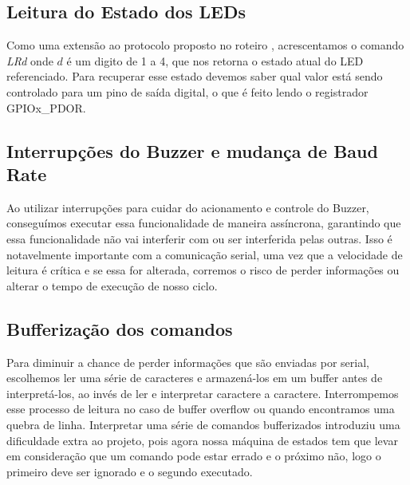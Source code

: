 \documentclass{article}
\begin{document}
\subsection{Leitura do Estado dos LEDs}
Como uma extensão ao protocolo proposto no roteiro \cite{bb:roteiro}, acrescentamos o comando \textit{LRd} onde $d$ é um digito de 1 a 4, que nos retorna o estado atual do LED referenciado. Para recuperar esse estado devemos saber qual valor está sendo controlado para um pino de saída digital, o que é feito lendo o registrador GPIOx\_PDOR.

\subsection{Interrupções do Buzzer e mudança de Baud Rate}
Ao utilizar interrupções para cuidar do acionamento e controle do Buzzer, conseguímos executar essa funcionalidade de maneira assíncrona, garantindo que essa funcionalidade não vai interferir com ou ser interferida pelas outras. Isso é notavelmente importante com a comunicação serial, uma vez que a velocidade de leitura é crítica e se essa for alterada, corremos o risco de perder informações ou alterar o tempo de execução de nosso ciclo.

\subsection{Bufferização dos comandos}
Para diminuir a chance de perder informações que são enviadas por serial, escolhemos ler uma série de caracteres e armazená-los em um buffer antes de interpretá-los, ao invés de ler e interpretar caractere a caractere. Interrompemos esse processo de leitura no caso de buffer overflow ou quando encontramos uma quebra de linha. Interpretar uma série de comandos bufferizados introduziu uma dificuldade extra ao projeto, pois agora nossa máquina de estados tem que levar em consideração que um comando pode estar errado e o próximo não, logo o primeiro deve ser ignorado e o segundo executado.
\end{document}
